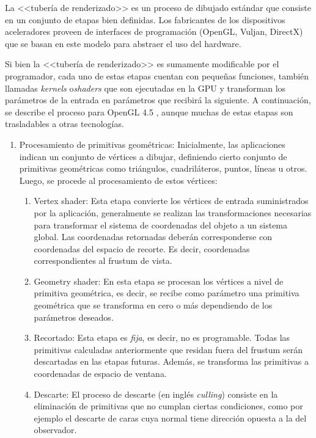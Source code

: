 La <<tubería de renderizado>> es un proceso de dibujado estándar que consiste en un conjunto de etapas bien definidas. Los fabricantes de los dispositivos aceleradores proveen de interfaces de programación (OpenGL, Vuljan, DirectX) que se basan en este modelo para abstraer el uso del hardware.

Si bien la <<tubería de renderizado>> es sumamente modificable por el programador, cada uno de estas etapas cuentan con pequeñas funciones, también llamadas \textit{kernels} o\textit{shaders} que son ejecutadas en la GPU y transforman los parámetros de la entrada en parámetros que recibirá la siguiente. A continuación, se describe el proceso para OpenGL 4.5 \cite{OpenGLWiki}, aunque muchas de estas etapas son trasladables a otras tecnologías.

\begin{enumerate}
	\item Procesamiento de primitivas geométricas:
		Inicialmente, las aplicaciones indican un conjunto de vértices a dibujar, definiendo cierto conjunto de primitivas geométricas como triángulos, cuadriláteros, puntos, líneas u otros. Luego, se procede al procesamiento de estos vértices:
		\begin{enumerate}
			\item Vertex shader: Esta etapa convierte los vértices de entrada suministrados por la aplicación, generalmente se realizan las transformaciones necesarias para transformar el sistema de coordenadas del objeto a un sistema global. Las coordenadas retornadas deberán corresponderse con coordenadas del espacio de recorte. Es decir, coordenadas correspondientes al frustum de vista.
			\item Geometry shader: En esta etapa se procesan los vértices a nivel de primitiva geométrica, es decir, se recibe como parámetro una primitiva geométrica que se transforma en cero o más dependiendo de los parámetros deseados.
			\item Recortado: Esta etapa es \textit{fija}, es decir, no es programable. Todas las primitivas calculadas anteriormente que residan fuera del frustum serán descartadas en las etapas futuras. Además, se transforma las primitivas a coordenadas de espacio de ventana.
			\item Descarte: El proceso de descarte (en inglés \textit{culling}) consiste en la eliminación de primitivas que no cumplan ciertas condiciones, como por ejemplo el descarte de caras cuya normal tiene dirección opuesta a la del observador.
		\end{enumerate}

\end{enumerate}
